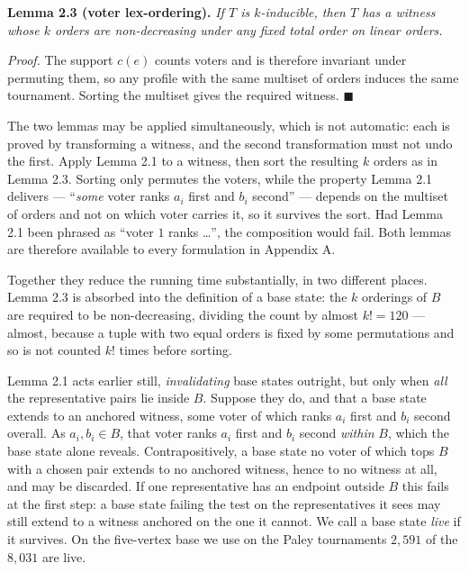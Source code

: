\documentclass[
]{article}
\begin{document}
\textbf{Lemma 2.3 (voter lex-ordering).} \emph{If \(T\) is
\(k\)-inducible, then \(T\) has a witness whose \(k\) orders are
non-decreasing under any fixed total order on linear orders.}

\emph{Proof.} The support \(c(e)\) counts voters and is therefore
invariant under permuting them, so any profile with the same multiset of
orders induces the same tournament. Sorting the multiset gives the
required witness. \(\blacksquare\)

The two lemmas may be applied simultaneously, which is not automatic:
each is proved by transforming a witness, and the second transformation
must not undo the first. Apply Lemma 2.1 to a witness, then sort the
resulting \(k\) orders as in Lemma 2.3. Sorting only permutes the
voters, while the property Lemma 2.1 delivers --- ``\emph{some} voter
ranks \(a_i\) first and \(b_i\) second'' --- depends on the multiset of
orders and not on which voter carries it, so it survives the sort. Had
Lemma 2.1 been phrased as ``voter \(1\) ranks \ldots{}'', the
composition would fail. Both lemmas are therefore available to every
formulation in Appendix A.

Together they reduce the running time substantially, in two different
places. Lemma 2.3 is absorbed into the definition of a base state: the
\(k\) orderings of \(B\) are required to be non-decreasing, dividing the
count by almost \(k! = 120\) --- almost, because a tuple with two equal
orders is fixed by some permutations and so is not counted \(k!\) times
before sorting.

Lemma 2.1 acts earlier still, \emph{invalidating} base states outright,
but only when \emph{all} the representative pairs lie inside \(B\).
Suppose they do, and that a base state extends to an anchored witness,
some voter of which ranks \(a_i\) first and \(b_i\) second overall. As
\(a_i, b_i \in B\), that voter ranks \(a_i\) first and \(b_i\) second
\emph{within} \(B\), which the base state alone reveals.
Contrapositively, a base state no voter of which tops \(B\) with a
chosen pair extends to no anchored witness, hence to no witness at all,
and may be discarded. If one representative has an endpoint outside
\(B\) this fails at the first step: a base state failing the test on the
representatives it sees may still extend to a witness anchored on the
one it cannot. We call a base state \emph{live} if it survives. On the
five-vertex base we use on the Paley tournaments \(2{,}591\) of the
\(8{,}031\) are live.
\end{document}
